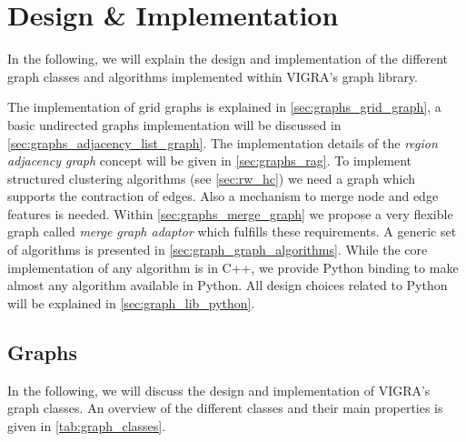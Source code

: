 

\section{Design \& Implementation}\label{sec:vigra_graph_lib_impl}


In the following, we will explain the design and 
implementation of the different graph classes and algorithms
implemented within VIGRA's graph library.


The implementation of grid graphs is explained in \cref{sec:graphs_grid_graph}, 
a basic undirected graphs implementation will be discussed in \cref{sec:graphs_adjacency_list_graph}.
The implementation details of the \emph{region adjacency graph} concept will 
be given in  \cref{sec:graphs_rag}.
To implement structured clustering algorithms (see \cref{sec:rw_hc}) we
need a graph which supports the contraction of edges.
Also a mechanism to merge node and edge features is needed.
Within \cref{sec:graphs_merge_graph} we propose  a very flexible graph 
called \emph{merge graph adaptor} which fulfills these requirements.
A generic set of algorithms  is presented 
in \cref{sec:graph_graph_algorithms}.
While the core implementation of any algorithm is in C++,
we provide Python binding to make almost
any algorithm available in Python.
All design choices related to Python will be explained in \cref{sec:graph_lib_python}.





\subsection{Graphs} \label{sec:impl_graphs}

In the following, we will discuss the design and implementation
of VIGRA's graph classes.
An overview of the different classes and their main properties
is given in \cref{tab:graph_classes}.

